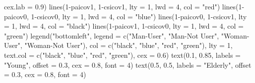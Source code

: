 \documentclass[
  letterpaper,
  DIV=11,
  numbers=noendperiod]{scrartcl}
\newenvironment{Shaded}{\begin{snugshade}}{\end{snugshade}}
\newcommand{\AttributeTok}[1]{\textcolor[rgb]{0.40,0.45,0.13}{#1}}
\newcommand{\DecValTok}[1]{\textcolor[rgb]{0.68,0.00,0.00}{#1}}
\newcommand{\FloatTok}[1]{\textcolor[rgb]{0.68,0.00,0.00}{#1}}
\newcommand{\FunctionTok}[1]{\textcolor[rgb]{0.28,0.35,0.67}{#1}}
\newcommand{\NormalTok}[1]{\textcolor[rgb]{0.00,0.23,0.31}{#1}}
\newcommand{\SpecialCharTok}[1]{\textcolor[rgb]{0.37,0.37,0.37}{#1}}
\newcommand{\StringTok}[1]{\textcolor[rgb]{0.13,0.47,0.30}{#1}}
\begin{document}
\begin{Shaded}
\begin{Highlighting}[]
\AttributeTok{cex.lab =} \FloatTok{0.9}\NormalTok{)}
\FunctionTok{lines}\NormalTok{(}\DecValTok{1}\SpecialCharTok{{-}}\NormalTok{paicov1, }\DecValTok{1}\SpecialCharTok{{-}}\NormalTok{csicov1, }\AttributeTok{lty =} \DecValTok{1}\NormalTok{, }\AttributeTok{lwd =} \DecValTok{4}\NormalTok{, }\AttributeTok{col =} \StringTok{"red"}\NormalTok{)}
\FunctionTok{lines}\NormalTok{(}\DecValTok{1}\SpecialCharTok{{-}}\NormalTok{paicov0, }\DecValTok{1}\SpecialCharTok{{-}}\NormalTok{csicov0, }\AttributeTok{lty =} \DecValTok{1}\NormalTok{, }\AttributeTok{lwd =} \DecValTok{4}\NormalTok{, }\AttributeTok{col =} \StringTok{"blue"}\NormalTok{)}
\FunctionTok{lines}\NormalTok{(}\DecValTok{1}\SpecialCharTok{{-}}\NormalTok{paicov0, }\DecValTok{1}\SpecialCharTok{{-}}\NormalTok{csicov1, }\AttributeTok{lty =} \DecValTok{1}\NormalTok{, }\AttributeTok{lwd =} \DecValTok{4}\NormalTok{, }\AttributeTok{col =} \StringTok{"black"}\NormalTok{)}
\FunctionTok{lines}\NormalTok{(}\DecValTok{1}\SpecialCharTok{{-}}\NormalTok{paicov1, }\DecValTok{1}\SpecialCharTok{{-}}\NormalTok{csicov0, }\AttributeTok{lty =} \DecValTok{1}\NormalTok{, }\AttributeTok{lwd =} \DecValTok{4}\NormalTok{, }\AttributeTok{col =} \StringTok{"green"}\NormalTok{)}
\FunctionTok{legend}\NormalTok{(}\StringTok{"bottomleft"}\NormalTok{, }\AttributeTok{legend =} \FunctionTok{c}\NormalTok{(}\StringTok{"Man{-}User"}\NormalTok{, }\StringTok{"Man{-}Not User"}\NormalTok{,}
\StringTok{"Woman{-}User"}\NormalTok{, }\StringTok{"Woman{-}Not User"}\NormalTok{), }\AttributeTok{col =} \FunctionTok{c}\NormalTok{(}\StringTok{"black"}\NormalTok{, }\StringTok{"blue"}\NormalTok{, }\StringTok{"red"}\NormalTok{, }\StringTok{"green"}\NormalTok{),}
\AttributeTok{lty =} \DecValTok{1}\NormalTok{, }\AttributeTok{text.col =} \FunctionTok{c}\NormalTok{(}\StringTok{"black"}\NormalTok{, }\StringTok{"blue"}\NormalTok{, }\StringTok{"red"}\NormalTok{, }\StringTok{"green"}\NormalTok{), }\AttributeTok{cex =} \FloatTok{0.6}\NormalTok{)}
\FunctionTok{text}\NormalTok{(}\FloatTok{0.1}\NormalTok{, }\FloatTok{0.85}\NormalTok{, }\AttributeTok{labels =} \StringTok{"Young"}\NormalTok{, }\AttributeTok{offset =} \FloatTok{0.3}\NormalTok{, }\AttributeTok{cex =} \FloatTok{0.8}\NormalTok{, }\AttributeTok{font =} \DecValTok{4}\NormalTok{)}
\FunctionTok{text}\NormalTok{(}\FloatTok{0.5}\NormalTok{, }\FloatTok{0.5}\NormalTok{, }\AttributeTok{labels =} \StringTok{"Elderly"}\NormalTok{, }\AttributeTok{offset =} \FloatTok{0.3}\NormalTok{, }\AttributeTok{cex =} \FloatTok{0.8}\NormalTok{, }\AttributeTok{font =} \DecValTok{4}\NormalTok{)}
\end{Highlighting}
\end{Shaded}
\end{document}
